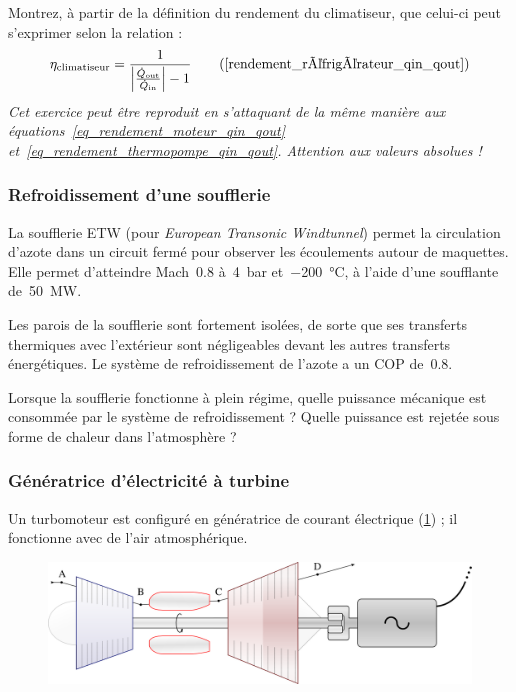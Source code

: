 	Montrez, à partir de la définition du rendement du climatiseur, que celui-ci peut s’exprimer selon la relation :
			\begin{equation}
				\eta_\text{climatiseur} = \frac{1}{\left| \frac{\dot{Q}_\text{out}}{\dot{Q}_\text{in}} \right| - 1} \tag{\ref{rendement_réfrigérateur_qin_qout}}
			\end{equation}
	{\small\textit{Cet exercice peut être reproduit en s’attaquant de la même manière aux équations~\ref{eq_rendement_moteur_qin_qout} et~\ref{eq_rendement_thermopompe_qin_qout}. Attention aux valeurs absolues !}}
	
	
\subsubsection{Refroidissement d’une soufflerie}

	La soufflerie ETW (pour \textit{European Transonic Windtunnel}) permet la circulation d’azote dans un circuit fermé pour observer les écoulements autour de maquettes. Elle permet d’atteindre Mach~\num{0,8} à~\SI{4}{\bar} et~\SI{-200}{\celsius}, à l’aide d’une soufflante de~\SI{50}{\mega\watt}.
	
	Les parois de la soufflerie sont fortement isolées, de sorte que ses transferts thermiques avec l’extérieur sont négligeables devant les autres transferts énergétiques. Le système de refroidissement de l’azote a un COP de~\num{0,8}. 
	
	Lorsque la soufflerie fonctionne à plein régime, quelle puissance mécanique est consommée par le système de refroidissement ? Quelle puissance est rejetée sous forme de chaleur dans l’atmosphère ?


\subsubsection{Génératrice d’électricité à turbine}

	Un turbomoteur est configuré en génératrice de courant électrique (\cref{fig_exo_turbomoteur}) ; il fonctionne avec de l’air atmosphérique.
	
	\begin{figure}
		\begin{center}
		\includegraphics[width=\textwidth]{images/elgen.png}
		\end{center}
		\label{fig_exo_turbomoteur}
	\end{figure}
		

